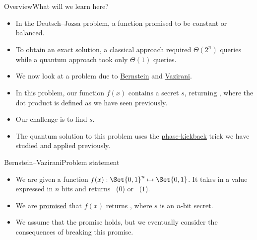 

\begin{frame}{Overview}{What will we learn here?}

\begin{itemize}
    \item In the Deutsch--Jozsa problem, a function promised to be constant or balanced.
    \item To obtain an exact solution, a classical approach required $\Theta(2^{n})$ queries while a quantum approach took only $\Theta(1)$ queries.
    \item We now look at a problem due to \href{https://en.wikipedia.org/wiki/Ethan_Bernstein}{Bernstein} and \href{https://en.wikipedia.org/wiki/Umesh_Vazirani}{Vazirani}.
    \item In this problem, our function $f(x)$ contains a secret $s$, returning , where the dot product is defined as we have seen previously.
    \item Our challenge is to find $s$.
    \item The quantum solution to this problem uses the \href{https://qiskit.org/textbook/ch-gates/phase-kickback.html}{phase-kickback} trick we have studied and applied previously.
\end{itemize}
    
\end{frame}

\begin{frame}{Bernstein--Vazirani}{Problem statement}

\begin{itemize}[<+->]
    \item We are given a function $f(x): \Set{0,1}^{n}\mapsto \Set{0,1}$.  It takes in a value expressed in $n$ bits and returns \False{}~($0$) or \True~($1$).
    \item We are \href{https://en.wikipedia.org/wiki/Promise_problem}{promised} that $f(x)$ returns , where $s$ is an $n$-bit secret.
    \item We assume that the promise holds, but we eventually consider the consequences of breaking this promise.
\end{itemize}
    
\end{frame}

